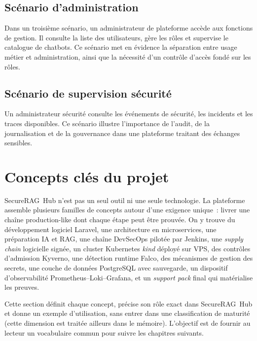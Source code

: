 \subsection{Scénario d’administration}

Dans un troisième scénario, un administrateur de plateforme accède aux fonctions de gestion. Il consulte la liste des utilisateurs, gère les rôles et supervise le catalogue de chatbots. Ce scénario met en évidence la séparation entre usage métier et administration, ainsi que la nécessité d’un contrôle d’accès fondé sur les rôles.

\subsection{Scénario de supervision sécurité}

Un administrateur sécurité consulte les événements de sécurité, les incidents et les traces disponibles. Ce scénario illustre l’importance de l’audit, de la journalisation et de la gouvernance dans une plateforme traitant des échanges sensibles.

\section{Concepts clés du projet}
\label{sec:concepts-cles}

SecureRAG~Hub n'est pas un seul outil ni une seule technologie. La plateforme
assemble plusieurs familles de concepts autour d'une exigence unique~: livrer
une chaîne production-like dont chaque étape peut être prouvée. On y trouve du
développement logiciel Laravel, une architecture en microservices, une
préparation IA et RAG, une chaîne DevSecOps pilotée par Jenkins, une
\emph{supply chain} logicielle signée, un cluster Kubernetes \emph{kind}
déployé sur VPS, des contrôles d'admission Kyverno, une détection runtime
Falco, des mécanismes de gestion des secrets, une couche de données
PostgreSQL avec sauvegarde, un dispositif d'observabilité
Prometheus--Loki--Grafana, et un \emph{support pack} final qui matérialise
les preuves.

Cette section définit chaque concept, précise son rôle exact dans
SecureRAG~Hub et donne un exemple d'utilisation, sans entrer dans une
classification de maturité (cette dimension est traitée ailleurs dans le
mémoire). L'objectif est de fournir au lecteur un vocabulaire commun pour
suivre les chapitres suivants.

